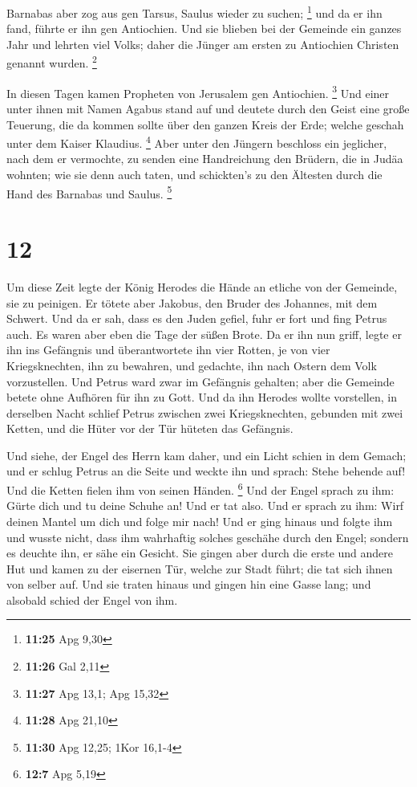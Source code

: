  Barnabas aber zog aus gen Tarsus, Saulus wieder zu
suchen; \footnote{\textbf{11:25} Apg 9,30}  und da er ihn
fand, führte er ihn gen Antiochien. Und sie blieben bei der Gemeinde ein
ganzes Jahr und lehrten viel Volks; daher die Jünger am ersten zu
Antiochien Christen genannt wurden. \footnote{\textbf{11:26} Gal 2,11}

 In diesen Tagen kamen Propheten von Jerusalem gen
Antiochien. \footnote{\textbf{11:27} Apg 13,1; Apg 15,32}
 Und einer unter ihnen mit Namen Agabus stand auf und
deutete durch den Geist eine große Teuerung, die da kommen sollte über
den ganzen Kreis der Erde; welche geschah unter dem Kaiser Klaudius.
\footnote{\textbf{11:28} Apg 21,10}  Aber unter den
Jüngern beschloss ein jeglicher, nach dem er vermochte, zu senden eine
Handreichung den Brüdern, die in Judäa wohnten;  wie sie
denn auch taten, und schickten's zu den Ältesten durch die Hand des
Barnabas und Saulus. \footnote{\textbf{11:30} Apg 12,25; 1Kor 16,1-4}

\hypertarget{section-3}{%
\section{12}\label{section-3}}

 Um diese Zeit legte der König Herodes die Hände an
etliche von der Gemeinde, sie zu peinigen.  Er tötete aber
Jakobus, den Bruder des Johannes, mit dem Schwert.  Und da
er sah, dass es den Juden gefiel, fuhr er fort und fing Petrus auch. Es
waren aber eben die Tage der süßen Brote.  Da er ihn nun
griff, legte er ihn ins Gefängnis und überantwortete ihn vier Rotten, je
von vier Kriegsknechten, ihn zu bewahren, und gedachte, ihn nach Ostern
dem Volk vorzustellen.  Und Petrus ward zwar im Gefängnis
gehalten; aber die Gemeinde betete ohne Aufhören für ihn zu Gott.
 Und da ihn Herodes wollte vorstellen, in derselben Nacht
schlief Petrus zwischen zwei Kriegsknechten, gebunden mit zwei Ketten,
und die Hüter vor der Tür hüteten das Gefängnis.

 Und siehe, der Engel des Herrn kam daher, und ein Licht
schien in dem Gemach; und er schlug Petrus an die Seite und weckte ihn
und sprach: Stehe behende auf! Und die Ketten fielen ihm von seinen
Händen. \footnote{\textbf{12:7} Apg 5,19}  Und der Engel
sprach zu ihm: Gürte dich und tu deine Schuhe an! Und er tat also. Und
er sprach zu ihm: Wirf deinen Mantel um dich und folge mir nach!
 Und er ging hinaus und folgte ihm und wusste nicht, dass
ihm wahrhaftig solches geschähe durch den Engel; sondern es deuchte ihn,
er sähe ein Gesicht.  Sie gingen aber durch die erste und
andere Hut und kamen zu der eisernen Tür, welche zur Stadt führt; die
tat sich ihnen von selber auf. Und sie traten hinaus und gingen hin eine
Gasse lang; und alsobald schied der Engel von ihm.

